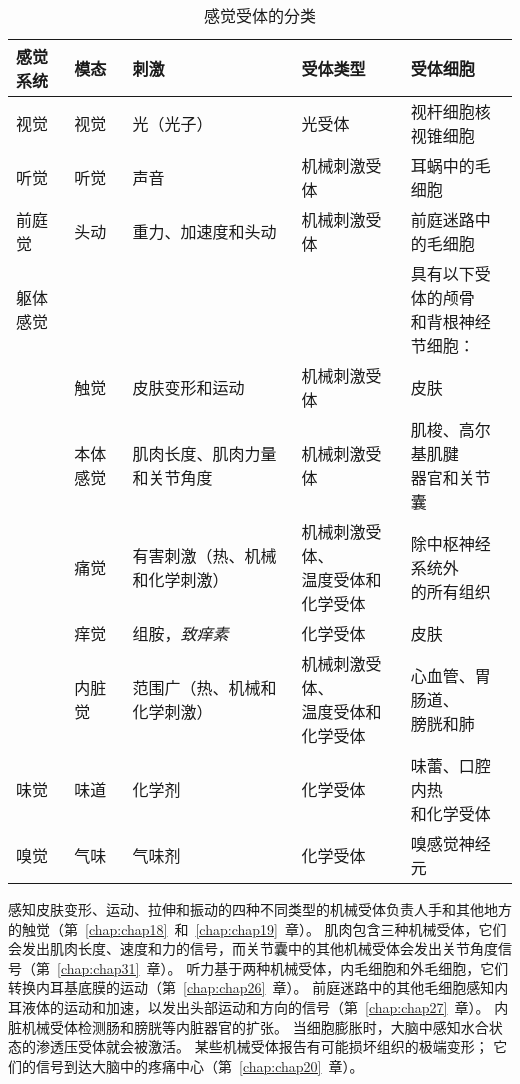 \begin{table}[htbp]
	\centering
	\caption{感觉受体的分类}
	\begin{tabular}{lllll}
		\toprule
		感觉系统 & 模态 & 刺激 & 受体类型 & 受体细胞 \\
		\midrule
		视觉 & 视觉 & 光（光子）   & 光受体 & 视杆细胞核视锥细胞\\
		听觉 & 听觉 & 声音   & 机械刺激受体 & 耳蜗中的毛细胞 \\
		前庭觉 & 头动 & 重力、加速度和头动   & 机械刺激受体 & 前庭迷路中的毛细胞 \\
		躯体感觉 &  &   &  & \makecell[l]{具有以下受体的颅骨 \\ 和背根神经节细胞：} \\
		 & 触觉 & 皮肤变形和运动   & 机械刺激受体 & 皮肤 \\
		 & 本体感觉 & 肌肉长度、肌肉力量和关节角度   & 机械刺激受体 & \makecell[l]{肌梭、高尔基肌腱 \\ 器官和关节囊}  \\
		 & 痛觉 & 有害刺激（热、机械和化学刺激）  & \makecell[l]{机械刺激受体、 \\ 温度受体和化学受体}  & \makecell[l]{除中枢神经系统外 \\ 的所有组织}  \\
		 & 痒觉 & 组胺，\textit{致痒素}  & 化学受体 & 皮肤 \\
		 & 内脏觉 & 范围广（热、机械和化学刺激）  & \makecell[l]{机械刺激受体、 \\ 温度受体和化学受体} & \makecell[l]{心血管、胃肠道、 \\ 膀胱和肺}  \\
		味觉 & 味道 & 化学剂   & 化学受体 & \makecell[l]{味蕾、口腔内热 \\ 和化学受体}  \\
		嗅觉 & 气味 & 气味剂   & 化学受体 & 嗅感觉神经元 \\
		\bottomrule
	\end{tabular}%
	\label{tab:17_1}%
\end{table}%


感知皮肤变形、运动、拉伸和振动的四种不同类型的机械受体负责人手和其他地方的触觉（第~\ref{chap:chap18}~和~\ref{chap:chap19}~章）。 
肌肉包含三种机械受体，它们会发出肌肉长度、速度和力的信号，而关节囊中的其他机械受体会发出关节角度信号（第~\ref{chap:chap31}~章）。 
听力基于两种机械受体，内毛细胞和外毛细胞，它们转换内耳基底膜的运动（第~\ref{chap:chap26}~章）。 
前庭迷路中的其他毛细胞感知内耳液体的运动和加速，以发出头部运动和方向的信号（第~\ref{chap:chap27}~章）。 
内脏机械受体检测肠和膀胱等内脏器官的扩张。 
当细胞膨胀时，大脑中感知水合状态的渗透压受体就会被激活。 
某些机械受体报告有可能损坏组织的极端变形； 
它们的信号到达大脑中的疼痛中心（第~\ref{chap:chap20}~章）。


